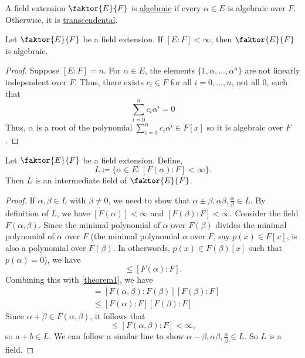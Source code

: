 \documentclass[11pt]{article}
\newcommand{\quotient}[2]{\faktor{#1}{#2}}
\begin{document}
\begin{definition}
A field extension $\quotient{E}{F}$ is \underline{algebraic} if every $\alpha
\in E$ is algebraic over $F$. Otherwise, it is \underline{transcendental}.
\end{definition}
\begin{theorem} \label{theorem6}
Let $\quotient{E}{F}$ be a field extension. If $[E:F] < \infty$, then
$\quotient{E}{F}$ is algebraic.
\end{theorem}
\begin{proof}
Suppose $[E:F] = n$. For $\alpha \in E$, the elements $\{1, \alpha, \dots,
\alpha^n\}$ are not linearly independent over $F$. Thus, there exists $c_i \in
F$ for all $i = 0, \dots , n$, not all 0, such that
\begin{equation*}
\sum^n_{i = 0} c_i\alpha^i = 0
\end{equation*}
Thus, $\alpha$ is a root of the polynomial $\sum^n_{i = 0} c_i\alpha^i \in
F[x]$ so it is algebraic over $F$.
\end{proof}
\begin{theorem}
Let $\quotient{E}{F}$ be a field extension. Define,
\begin{equation*}
L \coloneqq \{\alpha \in E: [F(\alpha) : F] < \infty\}.
\end{equation*}
Then $L$ is an intermediate field of $\quotient{E}{F}$.
\end{theorem}
\begin{proof}
If $\alpha, \beta \in L$ with $\beta \neq 0$, we need to show that $\alpha \pm
\beta, \alpha\beta, \frac{\alpha}{\beta} \in L$. By definition of $L$, we have
$[F(\alpha)] < \infty$ and $[F(\beta) : F] < \infty$. Consider the field
$F(\alpha, \beta)$. Since the minimal polynomial of $\alpha$ over $F(\beta)$
divides the minimal polynomial of $\alpha $ over $F$ (the minimal polynomial
$\alpha$ over $F$, say $p(x) \in F[x]$, is also a polynomial over $F(\beta)$.
In otherwords, $p(x) \in F(\beta)[x]$ such that $p(\alpha) = 0$), we have
\begin{equation*}
[F(\alpha, \beta):F(\beta)] \leq [F(\alpha):F].
\end{equation*}
Combining this with \cref{theorem1}, we have
\begin{align*}
[F(\alpha,\beta):F] &= [F(\alpha,\beta):F(\beta)][F(\beta):F]\\
&\leq [F(\alpha):F][F(\beta):F]
\end{align*}
Since $\alpha + \beta \in F(\alpha, \beta)$, it follows that
\begin{equation*}
[F(\alpha + \beta):F] \leq [F(\alpha, \beta):F] < \infty,
\end{equation*}
so $a+b\in L$. We can follow a similar line to show $\alpha - \beta,
\alpha\beta, \frac{\alpha}{\beta} \in L$. So $L$ is a field.
\end{proof}
\end{document}
